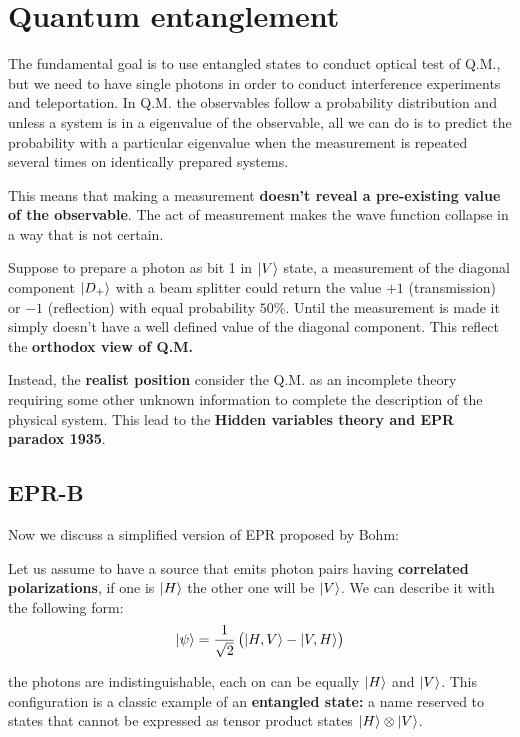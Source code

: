 \section{Quantum entanglement}\label{sec:quantum-entanglement}
The fundamental goal is to use entangled states to conduct optical test of Q.M., but we need to have single photons in order to conduct interference experiments and teleportation.
In Q.M. the observables follow a probability distribution and unless a system is in a eigenvalue of the observable, all we can do is to predict the probability with a particular eigenvalue when the measurement is repeated several times on identically prepared systems.

This means that making a measurement \textbf{doesn't reveal a pre-existing value of the observable}. The act of measurement makes the wave function collapse in a way that is not certain.

Suppose to prepare a photon as bit 1 in $\ket{V}$ state, a measurement of the diagonal component $\ket{D_+}$ with a beam splitter could return the value $+1$ (transmission) or $-1$ (reflection) with equal probability $50 \%$.
Until the measurement is made it simply doesn't have a well defined value of the diagonal component. This reflect the \textbf{orthodox view of Q.M.}

Instead, the \textbf{realist position} consider the Q.M. as an incomplete theory requiring some other unknown information to complete the description of the physical system. This lead to the \textbf{Hidden variables theory and EPR paradox 1935}.
\subsection{EPR-B}
Now we discuss a simplified version of EPR proposed by Bohm:

Let us assume to have  a source that emits photon pairs having \textbf{correlated polarizations}, if one is $\ket{H}$ the other one will be $\ket{V}$. We can describe it with the following form:
\begin{equation}\label{eqn:15-entangled-state-example}
\ket{\psi} = \frac{1}{\sqrt{2}} \,  \bigl(\ket{H,V}-\ket{V,H}\bigr)
\end{equation}

the photons are indistinguishable, each on can be equally $\ket{H}$ and $\ket{V}$. This configuration is a classic example of an \textbf{entangled state:} a name reserved to states that cannot be expressed as tensor product states $\ket{H}\otimes  \ket{V}$.

